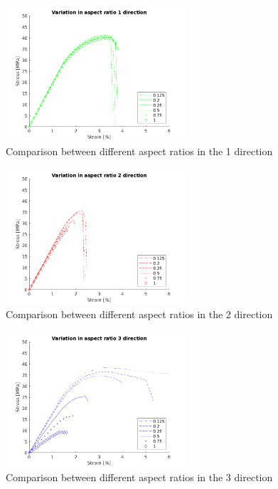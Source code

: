 \begin{figure}[H]
    \centering
    \includegraphics[width=0.60\textwidth]{chapter_7_non-elasticmodelling/figures/AR1.png}
    \caption{Comparison between different aspect ratios in the 1 direction}
    \label{fig:AR1}
\end{figure}
\begin{figure}[H]
    \centering
    \includegraphics[width=0.60\textwidth]{chapter_7_non-elasticmodelling/figures/AR2.png}
    \caption{Comparison between different aspect ratios in the 2 direction}
    \label{fig:AR2}
\end{figure}
\begin{figure}[H]
    \centering
    \includegraphics[width=0.60\textwidth]{chapter_7_non-elasticmodelling/figures/AR3.png}
    \caption{Comparison between different aspect ratios in the 3 direction}
    \label{fig:AR3}
\end{figure}
